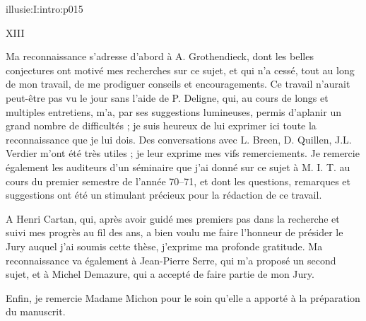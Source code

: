 \IllusieSetPhysicalPageSize{450.6bp}{704bp}
\begin{illusiefrontpage}{illusie:I:intro:p015}{}
\begin{center}\fontsize{10}{12}\selectfont XIII\end{center}
\vspace{12bp}
\hypertarget{illusie:I:intro:p015:p1}{}%
\hspace*{22bp}Ma reconnaissance s'adresse d'abord à A. Grothendieck, dont les belles
conjectures ont motivé mes recherches sur ce sujet, et qui n'a cessé, tout au long
de mon travail, de me prodiguer conseils et encouragements. Ce travail n'aurait
peut-être pas vu le jour sans l'aide de P. Deligne, qui, au cours de longs et
multiples entretiens, m'a, par ses suggestions lumineuses, permis d'aplanir un
grand nombre de difficultés ; je suis heureux de lui exprimer ici toute la
reconnaissance que je lui dois. Des conversations avec L. Breen, D. Quillen,
J.L. Verdier m'ont été très utiles ; je leur exprime mes vifs remerciements. Je
remercie également les auditeurs d'un séminaire que j'ai donné sur ce sujet à
M. I. T. au cours du premier semestre de l'année 70--71, et dont les questions,
remarques et suggestions ont été un stimulant précieux pour la rédaction de ce
travail.

\vspace{8bp}
\hypertarget{illusie:I:intro:p015:p2}{}%
\hspace*{22bp}A Henri Cartan, qui, après avoir guidé mes premiers pas dans la recherche
et suivi mes progrès au fil des ans, a bien voulu me faire l'honneur de présider
le Jury auquel j'ai soumis cette thèse, j'exprime ma profonde gratitude. Ma
reconnaissance va également à Jean-Pierre Serre, qui m'a proposé un second sujet,
et à Michel Demazure, qui a accepté de faire partie de mon Jury.

\vspace{8bp}
\hypertarget{illusie:I:intro:p015:p3}{}%
\hspace*{22bp}Enfin, je remercie Madame Michon pour le soin qu'elle a apporté à la
préparation du manuscrit.
\end{illusiefrontpage}
